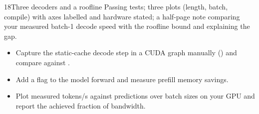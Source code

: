 \begin{labbox}{18}{Three decoders and a roofline}
Passing tests; three plots (length, batch, compile) with axes labelled and hardware stated; a
half-page note comparing your measured batch-1 decode speed with the roofline bound and explaining
the gap.

\begin{itemize}
  \item Capture the static-cache decode step in a CUDA graph manually ()
    and compare against .
  \item Add a  flag to the model forward and measure prefill memory savings.
  \item Plot measured tokens/s against  predictions over batch sizes on your GPU
    and report the achieved fraction of bandwidth.
\end{itemize}
\end{labbox}
